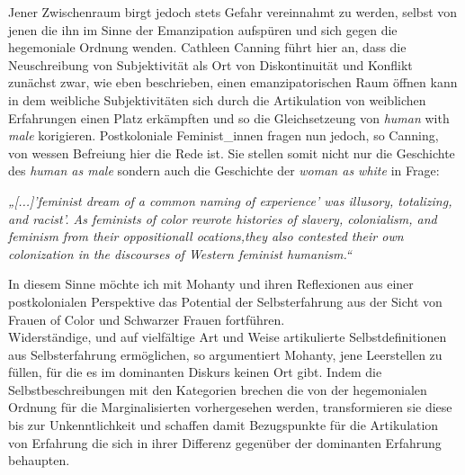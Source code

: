 \noindent Jener Zwischenraum birgt jedoch stets Gefahr vereinnahmt zu werden, selbst von
jenen die ihn im Sinne der Emanzipation aufspüren und sich gegen die
hegemoniale Ordnung wenden. Cathleen Canning\footnotemark {} führt hier an, dass die
Neuschreibung von Subjektivität als Ort von Diskontinuität und Konflikt
zunächst zwar, wie eben beschrieben, einen emanzipatorischen Raum öffnen kann
in dem weibliche Subjektivitäten sich durch die Artikulation von weiblichen
Erfahrungen einen Platz erkämpften und so die Gleichsetzeung von \textit{human} with
\textit{male} korigieren. Postkoloniale Feminist\_innen fragen nun jedoch, so Canning,
von wessen Befreiung hier die Rede ist. Sie stellen somit nicht nur die
Geschichte des \textit{human as male} sondern auch die Geschichte der \textit{woman as
white} in
Frage:
\begin{myenv}
 \textit{
 „[...]'feminist dream of a common naming of experience' was illusory,
 totalizing, and racist'. As feminists of color rewrote histories of slavery,
 colonialism, and feminism from their oppositionall ocations,they also
 contested their own colonization in the discourses of Western feminist
 humanism.“\footnotemark {} }
\end{myenv}
In diesem Sinne möchte ich mit Mohanty und ihren Reflexionen aus einer
postkolonialen Perspektive das Potential der Selbsterfahrung aus der Sicht von
Frauen of Color und Schwarzer Frauen fortführen.\\

Widerständige, und auf vielfältige Art und Weise artikulierte
Selbstdefinitionen aus Selbsterfahrung ermöglichen, so argumentiert Mohanty,
jene Leerstellen zu füllen, für die es im dominanten Diskurs keinen Ort gibt.
Indem die Selbstbeschreibungen mit den Kategorien brechen die von der
hegemonialen Ordnung für die Marginalisierten vorhergesehen werden,
transformieren sie diese bis zur Unkenntlichkeit und schaffen damit
Bezugspunkte für die Artikulation von Erfahrung die sich in ihrer Differenz
gegenüber der dominanten Erfahrung behaupten.\footnotemark{}\\

